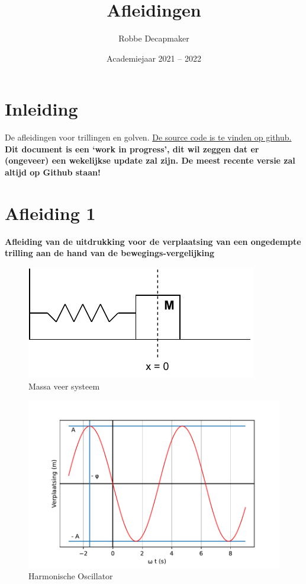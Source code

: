 \documentclass[a4paper,kul]{kulakarticle} %
\date{Academiejaar 2021 -- 2022}
\title{Afleidingen}
\author{Robbe Decapmaker}
\begin{document}
\maketitle

\section*{Inleiding}

De afleidingen voor trillingen en golven. \href{https://github.com/debber1/Afleidingen_TG}{De source code is te vinden op github.}\\
\textbf{Dit document is een `work in progress', dit wil zeggen dat er (ongeveer) een wekelijkse update zal zijn. De meest recente versie zal altijd op Github staan!}

\section{Afleiding 1}

\textbf{Afleiding van de uitdrukking voor de verplaatsing van een ongedempte trilling aan de hand van de bewegings-vergelijking}\\
\begin{figure}[htbp]
	\centering
	\includegraphics[width=0.4\linewidth]{MassaVeer}
	\caption[Massa veer systeem]{Massa veer systeem}
	\label{fig:massaveer}
\end{figure}
\begin{figure}[htbp]
	\centering
	\includegraphics[width=0.7\linewidth]{Harmonische_Oscillator}
	\caption[Harmonische Oscillator]{Harmonische Oscillator}
	\label{fig:harmonischeoscilator}
\end{figure}
\end{document}
